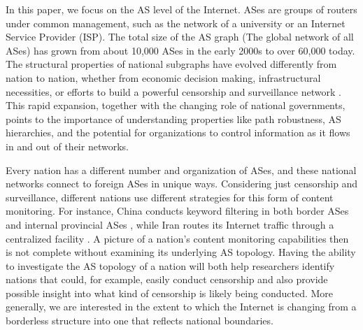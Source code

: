 \par
In this paper, we focus on the AS level of the Internet.
ASes are groups of routers under common management, such as the network of
a university or an Internet Service Provider (ISP).
The total size of the AS graph (The global network 
of all ASes) has grown from about 10,000 ASes in the early 2000s to over 60,000 today. 
The structural properties of national subgraphs have evolved differently
from nation to nation, whether from economic decision making, infrastructural necessities, 
or efforts to build a powerful censorship and surveillance network \cite{economicPeering, irancensor}.
This rapid expansion, together with the changing role of national
governments, points to the importance of understanding properties like
path robustness, AS hierarchies, and the potential for organizations to
control information as it flows in and out of their networks.

\par Every nation has a different number and organization of ASes, and
these national networks connect to foreign ASes in unique
ways. Considering just censorship and surveillance, different nations
use different strategies for this form of content monitoring. For
instance, China conducts keyword filtering in both border ASes and
internal provincial ASes \cite{chinafiltering}, while Iran routes its
Internet traffic through a centralized facility \cite{irancensor}.  A
picture of a nation's content monitoring capabilities then is not
complete without examining its underlying AS topology.  Having the
ability to investigate the AS topology of a nation will both help
researchers identify nations that could, for example, easily conduct
censorship and also provide possible insight into what kind of
censorship is likely being conducted.  More generally, we are
interested in the extent to which the Internet is changing from a
borderless structure into one that reflects national boundaries.

